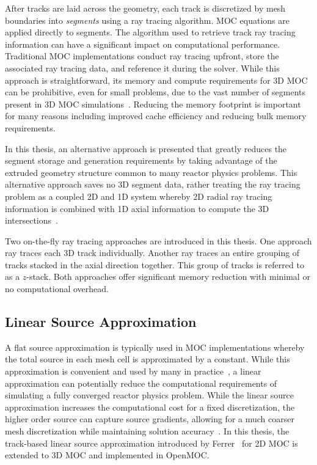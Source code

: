 \documentclass[12pt,twoside]{mitthesis-exec}
\begin{document}
After tracks are laid across the geometry, each track is discretized by mesh boundaries into \textit{segments} using a ray tracing algorithm. MOC equations are applied directly to segments. The algorithm used to retrieve track ray tracing information can have a significant impact on computational performance. Traditional MOC implementations conduct ray tracing upfront, store the associated ray tracing data, and reference it during the solver. While this approach is straightforward, its memory and compute requirements for 3D MOC can be prohibitive, even for small problems, due to the vast number of segments present in 3D MOC simulations~\cite{physor2016otf}. Reducing the memory footprint is important for many reasons including improved cache efficiency and reducing bulk memory requirements.

In this thesis, an alternative approach is presented that greatly reduces the segment storage and generation requirements by taking advantage of the extruded geometry structure common to many reactor physics problems. This alternative approach saves no 3D segment data, rather treating the ray tracing problem as a coupled 2D and 1D system whereby 2D radial ray tracing information is combined with 1D axial information to compute the 3D intersections~\cite{physor2016otf}.

Two on-the-fly ray tracing approaches are introduced in this thesis. One approach ray traces each 3D track individually. Another ray traces an entire grouping of tracks stacked in the axial direction together. This group of tracks is referred to as a $z$-stack. Both approaches offer significant memory reduction with minimal or no computational overhead.

\subsection*{Linear Source Approximation}

A flat source approximation is typically used in MOC implementations whereby the total source in each mesh cell is approximated by a constant. While this approximation is convenient and used by many in practice~\cite{kochunas, dragon_3d_moc, apollo3_vv, cactus_3d, liu_mrt, mockingbird}, a linear approximation can potentially reduce the computational requirements of simulating a fully converged reactor physics problem. While the linear source approximation increases the computational cost for a fixed discretization, the higher order source can capture source gradients, allowing for a much coarser mesh discretization while maintaining solution accuracy~\cite{ferrer2012linear}. In this thesis, the track-based linear source approximation introduced by Ferrer~\cite{ferrer2015linear} for 2D MOC is extended to 3D MOC and implemented in OpenMOC.
\end{document}
